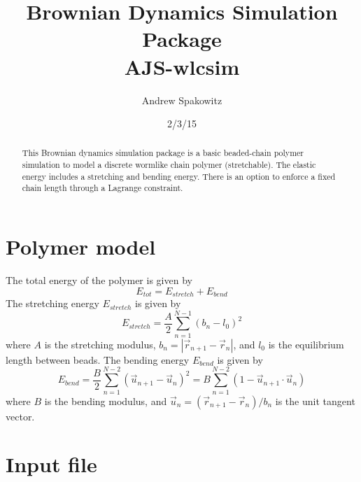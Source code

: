 \documentclass[11pt]{article}
\begin{document}
\title{Brownian Dynamics Simulation Package \\ AJS-wlcsim}
\author{Andrew Spakowitz}
\date{2/3/15}
\maketitle

\begin{abstract}
This Brownian dynamics simulation package is a basic beaded-chain
polymer simulation to model a discrete wormlike chain polymer (stretchable).
The elastic energy includes a stretching and bending energy.
There is an option to enforce a fixed chain length through a Lagrange constraint.
\end{abstract}

\section*{Polymer model}

The total energy of the polymer is given by
\begin{equation}
E_{tot} = E_{stretch} + E_{bend}
\end{equation}
\noindent
The stretching energy $E_{stretch}$ is given by
\begin{equation}
E_{stretch} = \frac{A}{2} \sum_{n=1}^{N-1}
\left( 
b_{n} - l_{0}
\right)^{2}
\end{equation}
\noindent
where $A$ is the stretching modulus, $b_{n} = \left| \vec{r}_{n+1} - \vec{r}_{n} \right|$,
and $l_{0}$ is the equilibrium length between beads.
The bending energy $E_{bend}$ is given by
\begin{equation}
E_{bend} = 
\frac{B}{2} \sum_{n=1}^{N-2} \left(
\vec{u}_{n+1} - \vec{u}_{n}
\right)^{2}=
B \sum_{n=1}^{N-2} \left( 1 - \vec{u}_{n+1} \cdot \vec{u}_{n} \right)
\end{equation}
\noindent
where $B$ is the bending modulus, and
$\vec{u}_{n} = \left( \vec{r}_{n+1} - \vec{r}_{n} \right)/b_{n}$ is
the unit tangent vector.

\section*{Input file}
\end{document}
